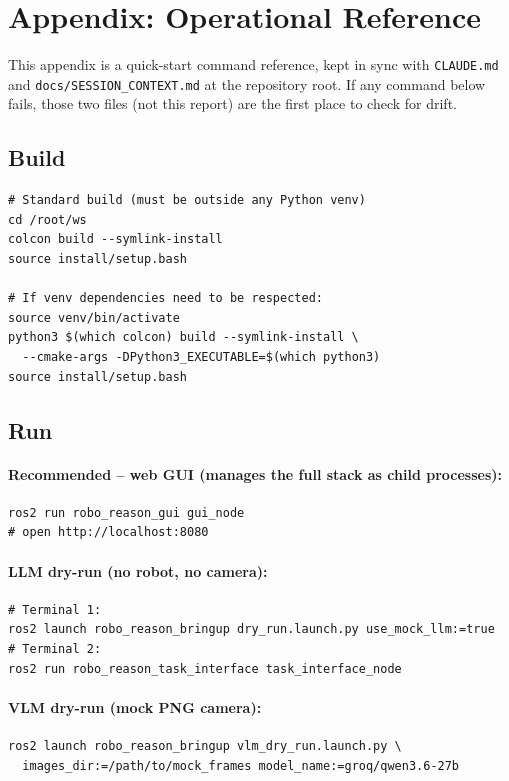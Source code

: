 \section{Appendix: Operational Reference}
\label{sec:appendix}

This appendix is a quick-start command reference, kept in sync with
\texttt{CLAUDE.md} and \texttt{docs/SESSION\_CONTEXT.md} at the repository
root. If any command below fails, those two files (not this report) are the
first place to check for drift.

\subsection{Build}

\begin{lstlisting}
# Standard build (must be outside any Python venv)
cd /root/ws
colcon build --symlink-install
source install/setup.bash

# If venv dependencies need to be respected:
source venv/bin/activate
python3 $(which colcon) build --symlink-install \
  --cmake-args -DPython3_EXECUTABLE=$(which python3)
source install/setup.bash
\end{lstlisting}

\subsection{Run}

\paragraph{Recommended -- web GUI (manages the full stack as child processes):}
\begin{lstlisting}
ros2 run robo_reason_gui gui_node
# open http://localhost:8080
\end{lstlisting}

\paragraph{LLM dry-run (no robot, no camera):}
\begin{lstlisting}
# Terminal 1:
ros2 launch robo_reason_bringup dry_run.launch.py use_mock_llm:=true
# Terminal 2:
ros2 run robo_reason_task_interface task_interface_node
\end{lstlisting}

\paragraph{VLM dry-run (mock PNG camera):}
\begin{lstlisting}
ros2 launch robo_reason_bringup vlm_dry_run.launch.py \
  images_dir:=/path/to/mock_frames model_name:=groq/qwen3.6-27b
\end{lstlisting}

